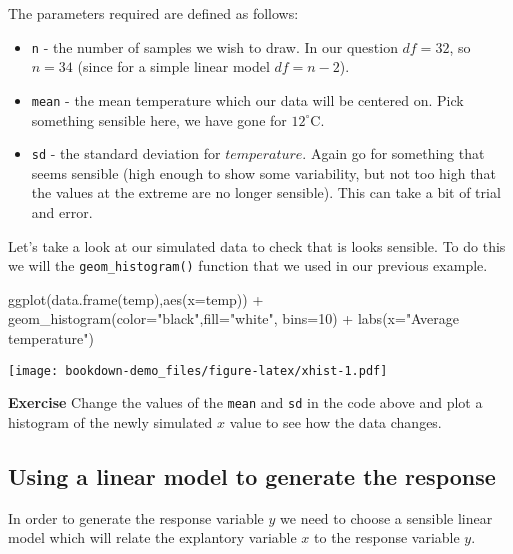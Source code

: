 \documentclass[
]{book}
\newenvironment{Shaded}{\begin{snugshade}}{\end{snugshade}}
\newcommand{\AttributeTok}[1]{\textcolor[rgb]{0.77,0.63,0.00}{#1}}
\newcommand{\DecValTok}[1]{\textcolor[rgb]{0.00,0.00,0.81}{#1}}
\newcommand{\FunctionTok}[1]{\textcolor[rgb]{0.00,0.00,0.00}{#1}}
\newcommand{\NormalTok}[1]{#1}
\newcommand{\SpecialCharTok}[1]{\textcolor[rgb]{0.00,0.00,0.00}{#1}}
\newcommand{\StringTok}[1]{\textcolor[rgb]{0.31,0.60,0.02}{#1}}
\providecommand{\tightlist}{%
  \setlength{\itemsep}{0pt}\setlength{\parskip}{0pt}}
\begin{document}
The parameters required are defined as follows:

\begin{itemize}
\tightlist
\item
  \texttt{n} - the number of samples we wish to draw. In our question \(df=32\), so \(n=34\) (since for a simple linear model \(df=n-2\)).
\item
  \texttt{mean} - the mean temperature which our data will be centered on. Pick something sensible here, we have gone for \(12^{\circ}\)C.
\item
  \texttt{sd} - the standard deviation for \(temperature\). Again go for something that seems sensible (high enough to show some variability, but not too high that the values at the extreme are no longer sensible). This can take a bit of trial and error.
\end{itemize}

Let's take a look at our simulated data to check that is looks sensible. To do this we will the \texttt{geom\_histogram()} function that we used in our previous example.

\begin{Shaded}
\begin{Highlighting}[]
\FunctionTok{ggplot}\NormalTok{(}\FunctionTok{data.frame}\NormalTok{(temp),}\FunctionTok{aes}\NormalTok{(}\AttributeTok{x=}\NormalTok{temp)) }\SpecialCharTok{+} 
  \FunctionTok{geom\_histogram}\NormalTok{(}\AttributeTok{color=}\StringTok{"black"}\NormalTok{,}\AttributeTok{fill=}\StringTok{"white"}\NormalTok{, }\AttributeTok{bins=}\DecValTok{10}\NormalTok{) }\SpecialCharTok{+} 
            \FunctionTok{labs}\NormalTok{(}\AttributeTok{x=}\StringTok{"Average temperature"}\NormalTok{)}
\end{Highlighting}
\end{Shaded}

\texttt{[image: bookdown-demo\_files/figure-latex/xhist-1.pdf]}

\textbf{Exercise}
Change the values of the \texttt{mean} and \texttt{sd} in the code above and plot a histogram of the newly simulated \(x\) value to see how the data changes.

\hypertarget{using-a-linear-model-to-generate-the-response}{%
\subsection{Using a linear model to generate the response}\label{using-a-linear-model-to-generate-the-response}}

In order to generate the response variable \(y\) we need to choose a sensible linear model which will relate the explantory variable \(x\) to the response variable \(y\).
\end{document}
